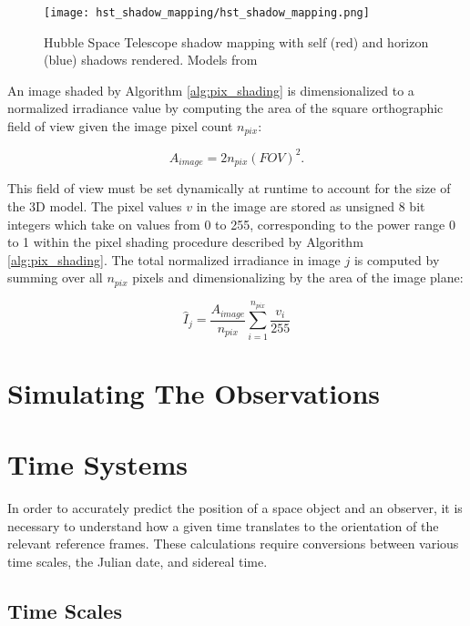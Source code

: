 \begin{figure}[!htb]
  \centering
  \texttt{[image: hst\_shadow\_mapping/hst\_shadow\_mapping.png]}
  \caption{Hubble Space Telescope shadow mapping with self (red) and horizon (blue) shadows rendered. Models from \cite{nasa_models}}
  \label{fig:hst_shadows_map}
\end{figure}
\graphicspath{{/Users/liamrobinson/Documents/PyLightCurves/docs/build/html/_images}}

An image shaded by Algorithm \ref{alg:pix_shading} is dimensionalized to a normalized irradiance value by computing the area of the square orthographic field of view given the image pixel count $n_{pix}$:

\begin{equation} \label{eq:ortho_area}
  A_{image} = 2 n_{pix} \left(FOV \right)^2.
\end{equation}

This field of view must be set dynamically at runtime to account for the size of the 3D model. The pixel values $v$ in the image are stored as unsigned 8 bit integers which take on values from 0 to 255, corresponding to the power range 0 to 1 within the pixel shading procedure described by Algorithm \ref{alg:pix_shading}. The total normalized irradiance in image $j$ is computed by summing over all $n_{pix}$ pixels and dimensionalizing by the area of the image plane:

\begin{equation} \label{eq:lc_normalized_engine}
  \hat{I}_j = \frac{A_{image}}{n_{pix}} \sum_{i=1}^{n_{pix}}{\frac{v_{i}}{255}}
\end{equation}

\section{Simulating The Observations}

\section{Time Systems}

In order to accurately predict the position of a space object and an observer, it is necessary to understand how a given time translates to the orientation of the relevant reference frames. These calculations require conversions between various time scales, the Julian date, and sidereal time.

\subsection{Time Scales}

